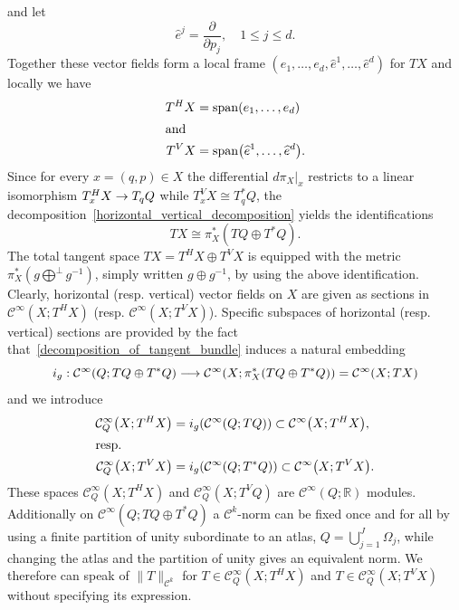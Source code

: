\documentclass[AHL,Unicode,longabstracts]{cedram}
\newcommand{\R}{\mathbb{R}}
\newcommand{\clC}{\mathcal{C}}
\newcommand{\p}{\partial}
\DeclareMathOperator{\spann}{span}
\let\originalleft\left
\let\originalright\right
\renewcommand{\left}{\mathopen{}\mathclose\bgroup\originalleft}
\renewcommand{\right}{\aftergroup\egroup\originalright}
\renewcommand*{\to}{\mathchoice{\longrightarrow}{\rightarrow}{\rightarrow}{\rightarrow}}
\begin{document}
and let
\begin{equation}\label{definiton_hat_e_j}
\widehat{e}^j = \frac{\p}{\p p_j}, \quad 1 \le j \le d.
\end{equation}
Together these vector fields form a local frame $(e_1, \dots, e_d, \widehat{e}^1, \dots, \widehat{e}^d)$ for $TX$ and locally we have
\begin{align}
T^H X &= \spann \left(e_1, \dots, e_d \right)
\\
\intertext{and}
T^V X &= \spann \left(\widehat{e}^1, \dots, \widehat{e}^d\right).
\end{align}
Since for every $x = (q,p) \in X$ the differential $d \pi_X|_x$ restricts to a linear isomorphism $T^H_x X \to T_q Q$ while $T^V_x X \cong T^*_q Q$, the decomposition~\eqref{horizontal_vertical_decomposition} yields the identifications
\begin{equation}\label{decomposition_of_tangent_bundle}
TX \cong \pi_{X}^{*}(TQ \oplus T^* Q).
\end{equation}
The total tangent space $TX=T^{H}X\oplus T^{V}X$ is equipped with the metric $\pi_{X}^{*}(g\bigoplus^{\perp}\!g^{-1})$, simply written $g\oplus g^{-1}$, by using the above identification. Clearly, horizontal (resp. vertical) vector fields on $X$ are given as sections in $\clC^{\infty}(X;T^{H}X)$ (resp. $\clC^{\infty}(X;T^{V}X)$). Specific subspaces of horizontal (resp. vertical) sections are provided by the fact that~\eqref{decomposition_of_tangent_bundle} induces a natural embedding
\[
i_{g}:\clC^{\infty}(Q;TQ\oplus T^{*}Q)\to \clC^{\infty}\left(X;\pi^{*}_{X}(TQ\oplus T^{*}Q)\right)=\clC^{\infty}(X;TX)
\]
and we introduce
\begin{align*}
 \clC^{\infty}_{Q}\left(X;T^{H}X\right)&=i_{g}(\clC^{\infty}(Q;TQ))\subset \clC^{\infty}\left(X;T^{H}X\right),\\
\intertext{resp.} \clC^{\infty}_{Q}\left(X;T^{V}X\right)&=i_{g}(\clC^{\infty}(Q;T^{*}Q))\subset \clC^{\infty}\left(X;T^{V}X\right).
\end{align*}
These spaces $\clC^{\infty}_{Q}(X;T^{H}X)$ and $\clC^{\infty}_{Q}(X;T^{V}Q)$ are $\clC^{\infty}(Q;\R)$ modules. Additionally on $\clC^{\infty}(Q;TQ\oplus T^{*}Q)$ a $\clC^{k}$-norm can be fixed once and for all by using a finite partition of unity subordinate to an atlas, $Q=\bigcup_{j=1}^{J}\Omega_{j}$, while changing the atlas and the partition of unity gives an equivalent norm. We therefore can speak of $\|T\|_{\clC^{k}}$ for $T\in \clC^{\infty}_{Q}(X;T^{H}X)$ and $T\in \clC^{\infty}_{Q}(X;T^{V}X)$ without specifying its expression.
\end{document}
